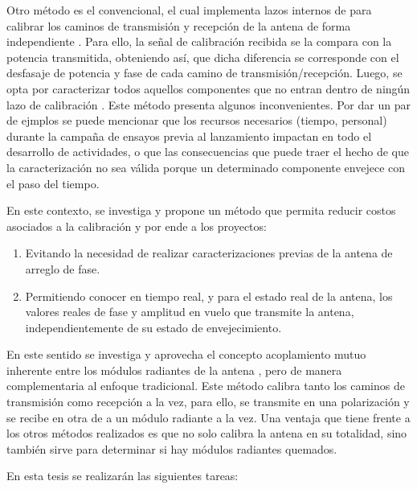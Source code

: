 Otro método es el convencional, el cual implementa lazos internos de para calibrar los caminos de transmisión y 
recepción de la antena de forma independiente \cite{Makhoul2012}\cite{Luscombe1990}\cite{Seifert1996}\cite{Dall1994}
\cite{Freeman1995}\cite{Bibby2003}\cite{Bast2003}\cite{Stove2004}\cite{Srivastava1996}\cite{Wang2010}.
Para ello, la señal de calibración recibida se la compara con la potencia transmitida, obteniendo así, que dicha diferencia 
se corresponde con el desfasaje de potencia y fase de cada camino de transmisión/recepción. Luego, se opta por caracterizar 
todos aquellos componentes que no entran dentro de ningún lazo de calibración \cite{Freeman1995}. Este método presenta 
algunos inconvenientes. Por dar un par de ejmplos se puede mencionar que los recursos necesarios (tiempo, personal) durante 
la campaña de ensayos previa al lanzamiento impactan en todo el desarrollo de actividades, o que las consecuencias que puede 
traer el hecho de que la caracterización no sea válida porque un determinado componente envejece con el paso del tiempo.

En este contexto, se investiga y propone un método que permita reducir costos 
asociados a la calibración y por ende a los proyectos:

\begin{enumerate}
    \item Evitando la necesidad de realizar caracterizaciones previas de la antena de arreglo de fase.
    \item Permitiendo conocer en tiempo real, y para el estado real de la antena, los valores reales de fase y amplitud en 
		vuelo que transmite la antena, independientemente de su estado de envejecimiento.
\end{enumerate}

En este sentido se investiga y aprovecha el concepto acoplamiento mutuo inherente entre los módulos radiantes de la antena 
\cite{Aumann1989}, pero de manera complementaria al enfoque tradicional. Este método calibra tanto los caminos de transmisión
como recepción a la vez, para ello, se transmite en una polarización y se recibe en otra de a un módulo radiante a la vez. 
Una ventaja que tiene frente a los otros métodos realizados es que no solo calibra la antena en su totalidad, sino también 
sirve para determinar si hay módulos radiantes quemados.

En esta tesis se realizarán las siguientes tareas:

